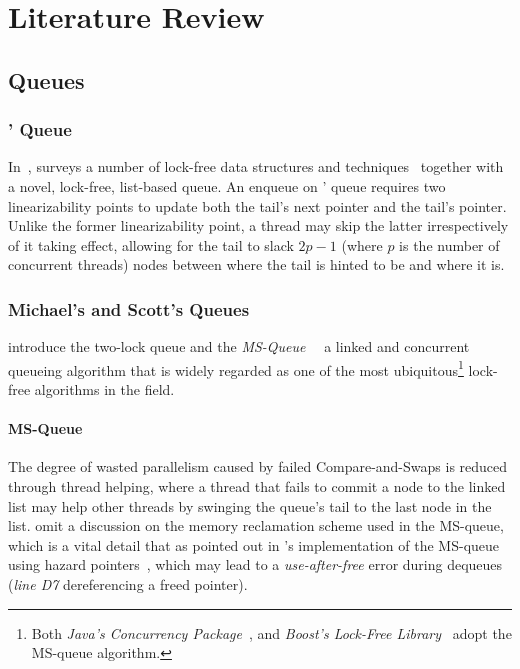 \chapter{Literature Review}
\label{chap:lit_review}

\section{Queues}
\subsection{\citeauthor{valois1994queues}' Queue}
In~\citep{valois1994queues,valois1995datastructures}, \citeauthor{valois1994queues}
surveys a number of lock-free data structures and techniques \textemdash~together with a novel, lock-free,
list-based queue. 
An enqueue on \citeauthor{valois1994queues}' queue requires two linearizability points 
to update both the tail's next pointer and the tail's pointer.
Unlike the former linearizability point, a thread may skip the latter irrespectively
of it taking effect, allowing for the tail to slack $2p-1$ (where $p$ is the number of concurrent threads)
nodes between where the tail is hinted to be and where it is.

\subsection{Michael's and Scott's Queues}
\citeauthor{michael1996simple} introduce the two-lock queue and the
\emph{MS-Queue}~\citep{michael1996simple} \textemdash~a linked and concurrent
queueing algorithm that is widely regarded as one of the most
ubiquitous\footnote{Both \emph{Java\texttrademark's Concurrency
Package}~\citep{java2022queue}, and \emph{Boost's Lock-Free
Library}~\citep{boost2022queue} adopt the MS-queue algorithm.} lock-free
algorithms in the field.

\subsubsection{MS-Queue}
The degree of wasted parallelism caused by failed Compare-and-Swaps is reduced
through thread helping, where a thread that fails to commit a node to the
linked list may help other threads by swinging the queue's tail to the last
node in the list. 
\citeauthor{michael1996simple} omit a discussion on the memory reclamation
scheme used in the MS-queue, which is a vital detail that as pointed out in
\citeauthor{michael2004hazard}'s implementation of the MS-queue using hazard
pointers~\citep{michael2004hazard}, which may lead to a \emph{use-after-free} error
during dequeues (\emph{line D7} dereferencing a freed pointer).


